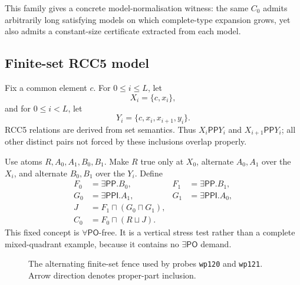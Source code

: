 \documentclass[11pt,letterpaper]{article}
\newcommand{\PO}{\ensuremath{\mathsf{PO}}}
\newcommand{\PP}{\ensuremath{\mathsf{PP}}}
\newcommand{\PPI}{\ensuremath{\mathsf{PPI}}}
\newcommand{\code}[1]{\nolinkurl{#1}}
\theoremstyle{definition}
\theoremstyle{plain}
\theoremstyle{remark}
\begin{document}
This family gives a concrete model-normalisation witness: the same $C_0$ admits
arbitrarily long satisfying models on which complete-type expansion grows, yet
also admits a constant-size certificate extracted from each model.

\subsection{Finite-set RCC5 model}

Fix a common element $c$.  For $0\leq i\leq L$, let
\[
  X_i=\{c,x_i\},
\]
and for $0\leq i<L$, let
\[
  Y_i=\{c,x_i,x_{i+1},y_i\}.
\]
RCC5 relations are derived from set semantics.  Thus
$X_i\PP Y_i$ and $X_{i+1}\PP Y_i$; all other distinct pairs not forced by
these inclusions overlap properly.

Use atoms $R,A_0,A_1,B_0,B_1$.  Make $R$ true only at $X_0$, alternate
$A_0,A_1$ over the $X_i$, and alternate $B_0,B_1$ over the $Y_i$.  Define
\[
\begin{aligned}
F_0&=\exists\PP.B_0, & F_1&=\exists\PP.B_1,\\
G_0&=\exists\PPI.A_1, & G_1&=\exists\PPI.A_0,\\
J&=F_1\sqcap(G_0\sqcap G_1),\\
C_0&=F_0\sqcap(R\sqcup J).
\end{aligned}
\]
This fixed concept is $\forall\PO$-free.  It is a vertical stress test rather
than a complete mixed-quadrant example, because it contains no
$\exists\PO$ demand.

\begin{figure}[ht]
\centering
{}
\caption{The alternating finite-set fence used by probes \code{wp120} and
\code{wp121}.  Arrow direction denotes proper-part inclusion.}
\end{figure}
\end{document}
